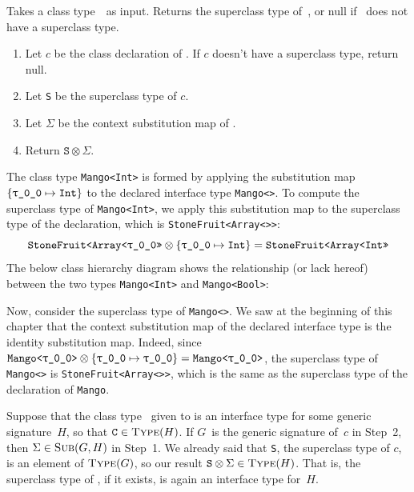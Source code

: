 \documentclass[../generics]{subfiles}
\begin{document}
\begin{algorithm}\label{superclass type of type} Takes a class type~\tC\ as input. Returns the superclass type of~\tC, or null if \tC\ does not have a superclass type.
\begin{enumerate}
\item Let $c$ be the class declaration of \tC. If $c$ doesn't have a superclass type, return null.
\item Let \texttt{S} be the superclass type of $c$.
\item Let $\Sigma$ be the context substitution map of \tC.
\item Return $\texttt{S}\otimes\Sigma$.
\end{enumerate}
\end{algorithm}
\begin{example}
The class type \texttt{Mango<Int>} is formed by applying the substitution map $\{\SubstType{\rT}{Int}\}$ to the declared interface type \texttt{Mango<\rT>}. To compute the superclass type of \texttt{Mango<Int>}, we apply this substitution map to the superclass type of the declaration, which is  \texttt{StoneFruit<Array<\rT>>}:
\[
\texttt{StoneFruit<Array<\rT>>} \otimes \{\SubstType{\rT}{Int}\} = \texttt{StoneFruit<Array<Int>>}
\]
The below class hierarchy diagram shows the relationship (or lack hereof) between the two types \texttt{Mango<Int>} and \texttt{Mango<Bool>}:
\begin{center}
\end{center}
Now, consider the superclass type of \texttt{Mango<\rT>}. We saw at the beginning of this chapter that the context substitution map of the declared interface type is the identity substitution map. Indeed, since $\texttt{Mango<\rT>} \otimes \SubstMap{\SubstType{\rT}{\rT}} = \texttt{Mango<\rT>}$, the superclass type of \texttt{Mango<\rT>} is \texttt{StoneFruit<Array<\rT>>}, which is the same as the superclass type of the declaration of \texttt{Mango}.
\end{example}
Suppose that the class type \tC\ given to  is an interface type for some generic signature~$H$, so that $\texttt{C}\in\textsc{Type}({H})$. If $G$~is the generic signature of~$c$ in Step~2, then $\Sigma\in\textsc{Sub}({G, H})$ in Step~1. We already said that \texttt{S}, the superclass type of $c$, is an element of $\textsc{Type}({G})$, so our result $\texttt{S}\otimes\Sigma\in\textsc{Type}({H})$. That is, the superclass type of \tC, if it exists, is again an interface type for~$H$.
\end{document}
